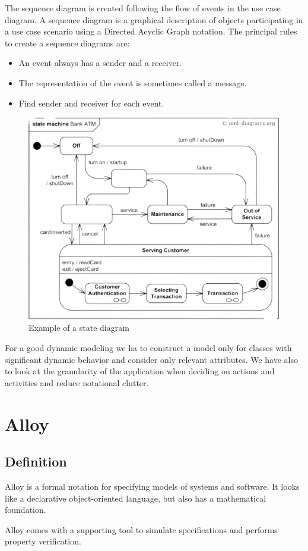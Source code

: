 \documentclass[12pt, a4paper]{report}
\begin{document}
    The sequence diagram is created following the flow of events in the use case diagram. A sequence diagram is a graphical description of objects participating in a use case 
    scenario using a Directed Acyclic Graph notation.
    The principal rules to create a sequence diagrams are: 
    \begin{itemize}
        \item An event always has a sender and a receiver.
        \item The representation of the event is sometimes called a message.
        \item Find sender and receiver for each event.
    \end{itemize}
    \begin{figure}[H]
        \centering
        \includegraphics[width=0.5\linewidth]{images/state.png}
        \caption{Example of a state diagram}
    \end{figure}
     
    For a good dynamic modeling we ha to construct a model only for classes with significant dynamic behavior and consider only relevant attributes. We have also to look at the
    granularity of the application when deciding on actions and activities and reduce notational clutter.

\newpage

\chapter{Alloy}
    \section{Definition}
        Alloy is a formal notation for specifying models of systems and software. It looks like a declarative object-oriented language, but also has a mathematical foundation.
         
        Alloy comes with a supporting tool to simulate specifications and performs property verification.
         
\end{document}
